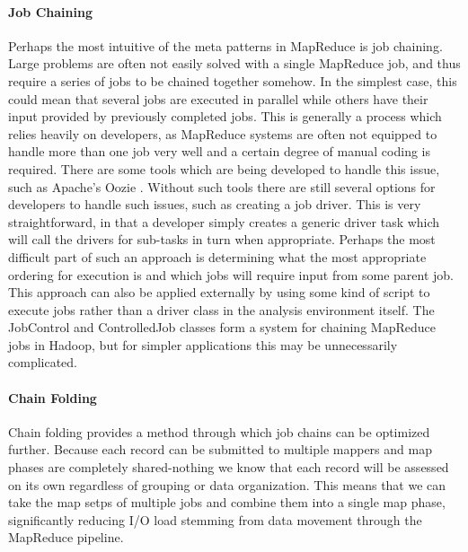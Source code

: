 \paragraph{Job Chaining}
Perhaps the most intuitive of the meta patterns in MapReduce is job chaining. Large problems are often not easily solved with a single MapReduce job, and thus require a series of jobs to be chained together somehow. In the simplest case, this could mean that several jobs are executed in parallel while others have their input provided by previously completed jobs. This is generally a process which relies heavily on developers, as MapReduce systems are often not equipped to handle more than one job very well and a certain degree of manual coding is required. There are some tools which are being developed to handle this issue, such as Apache's Oozie \citep{Islam2012}. Without such tools there are still several options for developers to handle such issues, such as creating  a job driver. This is very straightforward, in that a developer simply creates a generic driver task which will call the drivers for sub-tasks in turn when appropriate. Perhaps the most difficult part of such an approach is determining what the most appropriate ordering for execution is and which jobs will require input from some parent job. This approach can also be applied externally by using some kind of script to execute jobs rather than a driver class in the analysis environment itself. The JobControl and ControlledJob classes form a system for chaining MapReduce jobs in Hadoop, but for simpler applications this may be unnecessarily complicated. 

\paragraph{Chain Folding}
Chain folding provides a method through which job chains can be optimized further. Because each record can be submitted to multiple mappers and map phases are completely shared-nothing we know that each record will be assessed on its own regardless of grouping or data organization. This means that we can take the map setps of multiple jobs and combine them into a single map phase, significantly reducing I/O load stemming from data movement through the MapReduce pipeline.  

